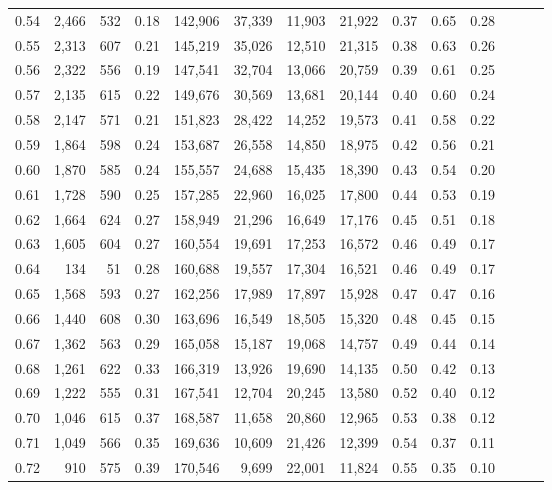 \begin{tabular}{rrrrrrrrrrrrrr}
0.54 &  2,466 &  532 &  0.18 &  142,906 &   37,339 &  11,903 &  21,922 &  0.37 &  0.65 &      0.28 \\
0.55 &  2,313 &  607 &  0.21 &  145,219 &   35,026 &  12,510 &  21,315 &  0.38 &  0.63 &      0.26 \\
0.56 &  2,322 &  556 &  0.19 &  147,541 &   32,704 &  13,066 &  20,759 &  0.39 &  0.61 &      0.25 \\
0.57 &  2,135 &  615 &  0.22 &  149,676 &   30,569 &  13,681 &  20,144 &  0.40 &  0.60 &      0.24 \\
0.58 &  2,147 &  571 &  0.21 &  151,823 &   28,422 &  14,252 &  19,573 &  0.41 &  0.58 &      0.22 \\
0.59 &  1,864 &  598 &  0.24 &  153,687 &   26,558 &  14,850 &  18,975 &  0.42 &  0.56 &      0.21 \\
0.60 &  1,870 &  585 &  0.24 &  155,557 &   24,688 &  15,435 &  18,390 &  0.43 &  0.54 &      0.20 \\
0.61 &  1,728 &  590 &  0.25 &  157,285 &   22,960 &  16,025 &  17,800 &  0.44 &  0.53 &      0.19 \\
0.62 &  1,664 &  624 &  0.27 &  158,949 &   21,296 &  16,649 &  17,176 &  0.45 &  0.51 &      0.18 \\
0.63 &  1,605 &  604 &  0.27 &  160,554 &   19,691 &  17,253 &  16,572 &  0.46 &  0.49 &      0.17 \\
0.64 &    134 &   51 &  0.28 &  160,688 &   19,557 &  17,304 &  16,521 &  0.46 &  0.49 &      0.17 \\
0.65 &  1,568 &  593 &  0.27 &  162,256 &   17,989 &  17,897 &  15,928 &  0.47 &  0.47 &      0.16 \\
0.66 &  1,440 &  608 &  0.30 &  163,696 &   16,549 &  18,505 &  15,320 &  0.48 &  0.45 &      0.15 \\
0.67 &  1,362 &  563 &  0.29 &  165,058 &   15,187 &  19,068 &  14,757 &  0.49 &  0.44 &      0.14 \\
0.68 &  1,261 &  622 &  0.33 &  166,319 &   13,926 &  19,690 &  14,135 &  0.50 &  0.42 &      0.13 \\
0.69 &  1,222 &  555 &  0.31 &  167,541 &   12,704 &  20,245 &  13,580 &  0.52 &  0.40 &      0.12 \\
0.70 &  1,046 &  615 &  0.37 &  168,587 &   11,658 &  20,860 &  12,965 &  0.53 &  0.38 &      0.12 \\
0.71 &  1,049 &  566 &  0.35 &  169,636 &   10,609 &  21,426 &  12,399 &  0.54 &  0.37 &      0.11 \\
0.72 &    910 &  575 &  0.39 &  170,546 &    9,699 &  22,001 &  11,824 &  0.55 &  0.35 &      0.10 \\

\end{tabular}
